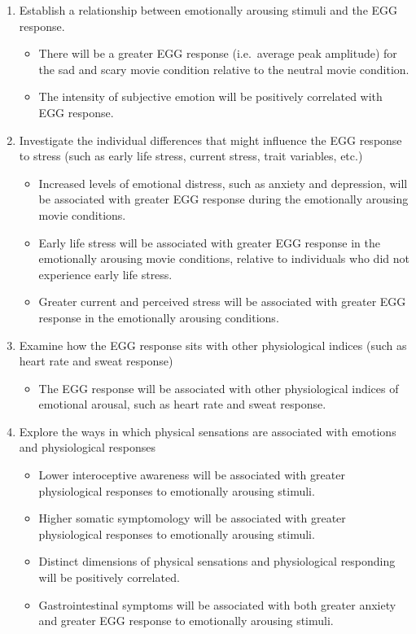 \documentclass[]{book}
\providecommand{\tightlist}{%
  \setlength{\itemsep}{0pt}\setlength{\parskip}{0pt}}
\begin{document}
\begin{enumerate}
\def\labelenumi{\arabic{enumi}.}
\tightlist
\item
  Establish a relationship between emotionally arousing stimuli and the EGG response.

  \begin{itemize}
  \tightlist
  \item
    There will be a greater EGG response (i.e.~average peak amplitude) for the sad and scary movie condition relative to the neutral movie condition.
  \item
    The intensity of subjective emotion will be positively correlated with EGG response.
  \end{itemize}
\item
  Investigate the individual differences that might influence the EGG response to stress (such as early life stress, current stress, trait variables, etc.)

  \begin{itemize}
  \tightlist
  \item
    Increased levels of emotional distress, such as anxiety and depression, will be associated with greater EGG response during the emotionally arousing movie conditions.
  \item
    Early life stress will be associated with greater EGG response in the emotionally arousing movie conditions, relative to individuals who did not experience early life stress.
  \item
    Greater current and perceived stress will be associated with greater EGG response in the emotionally arousing conditions.
  \end{itemize}
\item
  Examine how the EGG response sits with other physiological indices (such as heart rate and sweat response)

  \begin{itemize}
  \tightlist
  \item
    The EGG response will be associated with other physiological indices of emotional arousal, such as heart rate and sweat response.
  \end{itemize}
\item
  Explore the ways in which physical sensations are associated with emotions and physiological responses

  \begin{itemize}
  \tightlist
  \item
    Lower interoceptive awareness will be associated with greater physiological responses to emotionally arousing stimuli.
  \item
    Higher somatic symptomology will be associated with greater physiological responses to emotionally arousing stimuli.
  \item
    Distinct dimensions of physical sensations and physiological responding will be positively correlated.
  \item
    Gastrointestinal symptoms will be associated with both greater anxiety and greater EGG response to emotionally arousing stimuli.
  \end{itemize}
\end{enumerate}


\end{document}
